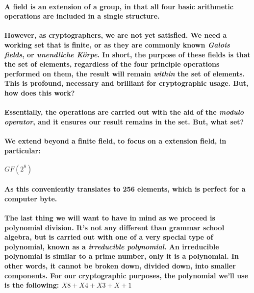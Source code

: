\paragraph{A field is an extension of a group, in that all four basic arithmetic operations are included in a single structure.}\cite[p. 92]{PaarPelzl} 

\paragraph{However, as cryptographers, we are not yet satisfied. We need a working set that is finite, or as they are commonly known \emph{Galois fields}, or \emph{unendliche Körpe}. In short, the purpose of these fields is that the set of elements, regardless of the four principle operations performed on them, the result will remain \emph{within} the set of elements. This is profound, necessary and brilliant for cryptographic usage. But, how does this work?}

\paragraph{Essentially, the operations are carried out with the aid of the \emph{modulo operator}, and it ensures our result remains in the set. But, what set?}

\paragraph{We extend beyond a finite field, to focus on a extension field, in particular:}

$GF(2^8)$

\paragraph{As this conveniently translates to 256 elements, which is perfect for a computer byte.}

\paragraph{The last thing we will want to have in mind as we proceed is polynomial division. It's not any different than grammar school algebra, but is carried out with one of a very special type of polynomial, known as a \emph{irreducible polynomial}. An irreducible polynomial is similar to a prime number, only it is a polynomial. In other words, it cannot be broken down, divided down, into smaller components. For our cryptographic purposes, the polynomial we'll use is the following: $X8 + X4 + X3 + X + 1$}\cite[p.21]{DelfsKnebl}


